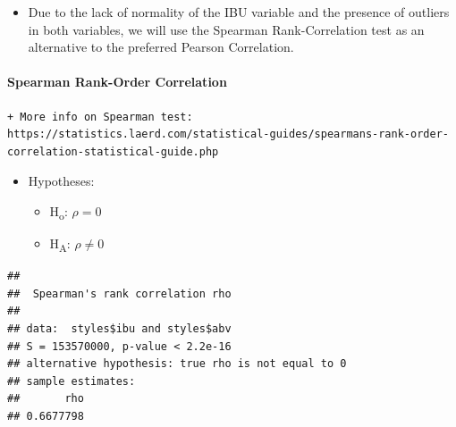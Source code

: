 \documentclass[]{article}
\newenvironment{Shaded}{\begin{snugshade}}{\end{snugshade}}
\newcommand{\KeywordTok}[1]{\textcolor[rgb]{0.13,0.29,0.53}{\textbf{#1}}}
\newcommand{\DataTypeTok}[1]{\textcolor[rgb]{0.13,0.29,0.53}{#1}}
\newcommand{\DecValTok}[1]{\textcolor[rgb]{0.00,0.00,0.81}{#1}}
\newcommand{\StringTok}[1]{\textcolor[rgb]{0.31,0.60,0.02}{#1}}
\newcommand{\CommentTok}[1]{\textcolor[rgb]{0.56,0.35,0.01}{\textit{#1}}}
\newcommand{\OtherTok}[1]{\textcolor[rgb]{0.56,0.35,0.01}{#1}}
\newcommand{\OperatorTok}[1]{\textcolor[rgb]{0.81,0.36,0.00}{\textbf{#1}}}
\newcommand{\NormalTok}[1]{#1}
\providecommand{\tightlist}{%
  \setlength{\itemsep}{0pt}\setlength{\parskip}{0pt}}
\let\oldparagraph\paragraph
\renewcommand{\paragraph}[1]{\oldparagraph{#1}\mbox{}}
\begin{document}
\begin{itemize}
\tightlist
\item
  Due to the lack of normality of the IBU variable and the presence of
  outliers in both variables, we will use the Spearman Rank-Correlation
  test as an alternative to the preferred Pearson Correlation.
\end{itemize}

\paragraph{Spearman Rank-Order
Correlation}\label{spearman-rank-order-correlation}

\begin{verbatim}
+ More info on Spearman test: https://statistics.laerd.com/statistical-guides/spearmans-rank-order-correlation-statistical-guide.php
\end{verbatim}

\begin{itemize}
\tightlist
\item
  Hypotheses:

  \begin{itemize}
  \tightlist
  \item
    H\textsubscript{o}: \(\rho = 0\)
  \item
    H\textsubscript{A}: \(\rho \neq 0\)
  \end{itemize}
\end{itemize}

\begin{Shaded}
\end{Shaded}

\begin{verbatim}
## 
##  Spearman's rank correlation rho
## 
## data:  styles$ibu and styles$abv
## S = 153570000, p-value < 2.2e-16
## alternative hypothesis: true rho is not equal to 0
## sample estimates:
##       rho 
## 0.6677798
\end{verbatim}
\end{document}
